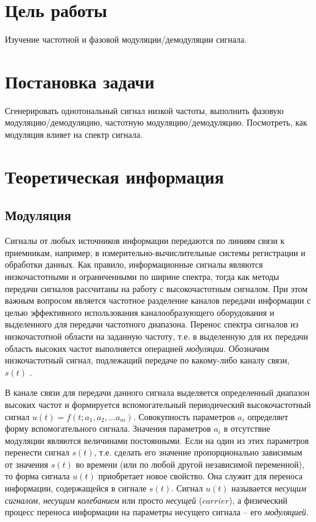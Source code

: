 

\setcounter{tocdepth}{3}







\section{Цель работы}
Изучение частотной и фазовой модуляции/демодуляции сигнала.
\section{Постановка задачи}
Сгенерировать однотональный сигнал низкой частоты, выполнить фазовую модуляцию/демодуляцию, частотную модуляцию/демодуляцию. Посмотреть, как модуляция влияет на спектр сигнала.

\section{Теоретическая информация}

\subsection{Модуляция}
Сигналы от любых источников информации передаются по линиям связи к приемникам, например, в измерительно-вычислительные системы регистрации и обработки данных. Как правило, информационные сигналы являются низкочастотными и ограниченными по ширине спектра, тогда как методы передачи сигналов рассчитаны на работу с высокочастотным сигналом. При этом важным вопросом является частотное разделение каналов передачи информации с целью эффективного использования каналообразующего оборудования и выделенного для передачи частотного диапазона. Перенос спектра сигналов из низкочастотной области на заданную частоту, т.е. в выделенную для их передачи область высоких частот выполняется операцией \textit{модуляции}. Обозначим низкочастотный сигнал, подлежащий передаче по какому-либо каналу связи, $s(t)$ .   

В канале связи для передачи данного сигнала выделяется определенный диапазон высоких частот и формируется вспомогательный периодический высокочастотный сигнал $u(t)   =   f(t;   a_1,   a_2,   ...   a_m)$. Совокупность параметров $a_i$ определяет форму вспомогательного сигнала. Значения параметров $a_i$ в отсутствие модуляции являются величинами постоянными. Если на один из этих параметров перенести сигнал $s(t)$, т.е. сделать его значение пропорционально зависимым от значения $s(t)$ во времени (или по любой другой независимой переменной), то форма сигнала $u(t)$ приобретает новое свойство. Она служит для переноса информации, содержащейся в сигнале $s(t)$. Сигнал $u(t)$ называется \textit{несущим сигналом}, \textit{несущим колебанием} или просто \textit{несущей}  ($carrier$),  а физический процесс переноса информации на
параметры несущего сигнала     –     его \textit{модуляцией}. 

